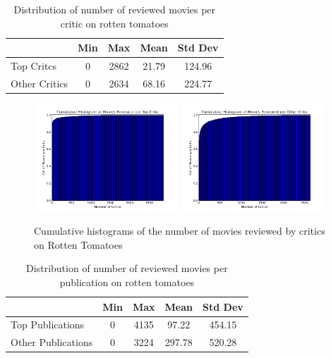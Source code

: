 \documentclass[12pt]{article}
\begin{document}
	\begin{table}[H]
	 \centering
	 \caption{Distribution of number of reviewed movies per critic on rotten tomatoes} 
	 \begin{tabular}{ l | c | c | c | c }
	 \hline
	 &  Min & Max & Mean & Std Dev  \\
	 \hline
	 Top Critcs & 0 & 2862 & 21.79 & 124.96 \\
	 Other Critics & 0 & 2634 & 68.16 & 224.77 \\
	 \hline
	 \end{tabular}
	 \end{table}

	\begin{figure}[H]
	    \centering
	    \includegraphics[width=0.48\textwidth]{plots/plot_r_crit_top.png}
	    \includegraphics[width=0.48\textwidth]{plots/plot_r_crit_oth.png}
	    \caption{Cumulative histograms of the number of movies reviewed by critics on Rotten Tomatoes}
	    \label{fig:r_crit}
	\end{figure}


	\begin{table}[H]
	 \centering
	 \caption{Distribution of number of reviewed movies per publication on rotten tomatoes} 
	 \begin{tabular}{ l | c | c | c | c }
	 \hline
	 &  Min & Max & Mean & Std Dev  \\
	 \hline
	 Top Publications & 0 & 4135 & 97.22 & 454.15 \\
	 Other Publications & 0 & 3224 & 297.78 & 520.28 \\
	 \hline
	 \end{tabular}
	 \end{table}
\end{document}
